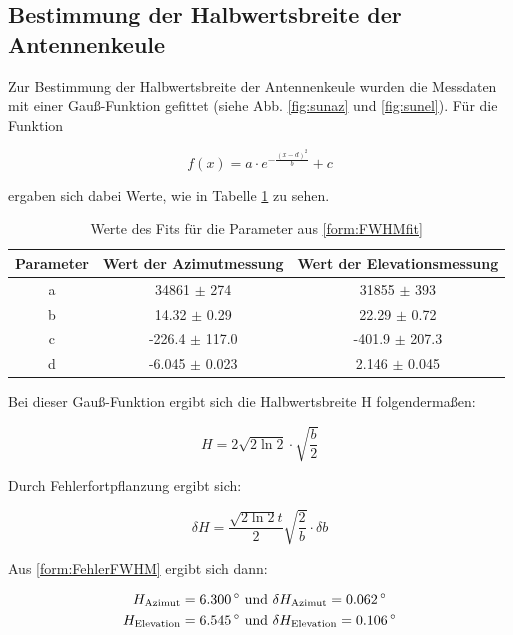 \subsection{Bestimmung der Halbwertsbreite der Antennenkeule}
Zur Bestimmung der Halbwertsbreite der Antennenkeule wurden die Messdaten mit einer Gauß-Funktion gefittet (siehe Abb. \ref{fig:sunaz} und \ref{fig:sunel}). Für die Funktion

\begin{equation}
f(x) = a \cdot e^{- \frac{(x-d)^2}{b}} + c
\label{form:FWHMfit}
\end{equation}

ergaben sich dabei Werte, wie in Tabelle \ref{tab:FWHM} zu sehen.

\begin{table}
\centering
\begin{tabular}{ccc}
Parameter	&			Wert der Azimutmessung	&	Wert der Elevationsmessung \\
\midrule
a			&			34861 $\pm$ 274			&	31855 $\pm$ 393 \\
b			&			14.32 $\pm$ 0.29		&	22.29 $\pm$ 0.72 \\
c			&			-226.4 $\pm$ 117.0		&	-401.9 $\pm$ 207.3 \\
d			&			-6.045 $\pm$ 0.023		&	2.146 $\pm$ 0.045
\end{tabular}
\caption{Werte des Fits für die Parameter aus \eqref{form:FWHMfit}}
\label{tab:FWHM}
\end{table}

Bei dieser Gauß-Funktion ergibt sich die Halbwertsbreite H folgendermaßen:

\begin{equation}
H = 2 \sqrt{2 \ln 2} \cdot \sqrt{\frac{b}{2}}
\end{equation}

Durch Fehlerfortpflanzung ergibt sich:

\begin{equation}
\delta H = \frac{\sqrt{2 \ln 2}t}{2} \sqrt{\frac{2}{b}} \cdot \delta b
\label{form:FehlerFWHM}
\end{equation}

Aus \eqref{form:FehlerFWHM} ergibt sich dann:

\begin{align*}
H_{\mathrm{Azimut}} = 6.300\,^\circ \ &\mathrm{und} \ \delta H_{\mathrm{Azimut}} = 0.062\,^\circ \\
H_{\mathrm{Elevation}} = 6.545\,^\circ \ &\mathrm{und} \ \delta H_{\mathrm{Elevation}} = 0.106\,^\circ
\end{align*}

